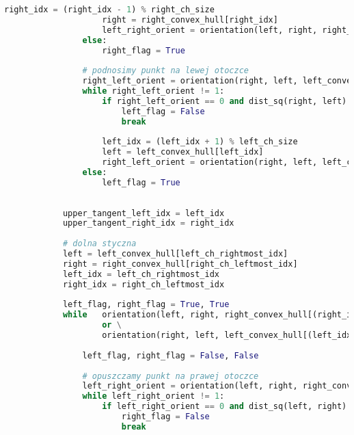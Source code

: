 \documentclass[11pt]{article}
\theoremstyle{remark} \newtheorem{definition}{def.}
\theoremstyle{definition} \newtheorem{twierdzenie}{tw.}
\begin{document}
\begin{lstlisting}[language=Python]
                    right_idx = (right_idx - 1) % right_ch_size
                    right = right_convex_hull[right_idx]
                    left_right_orient = orientation(left, right, right_convex_hull[(right_idx - 1) % right_ch_size])
                else:
                    right_flag = True
        
                # podnosimy punkt na lewej otoczce
                right_left_orient = orientation(right, left, left_convex_hull[(left_idx + 1) % left_ch_size])
                while right_left_orient != 1:
                    if right_left_orient == 0 and dist_sq(right, left) >= dist_sq(right, left_convex_hull[(left_idx + 1) % left_ch_size]):
                        left_flag = False
                        break
                    
                    left_idx = (left_idx + 1) % left_ch_size
                    left = left_convex_hull[left_idx]
                    right_left_orient = orientation(right, left, left_convex_hull[(left_idx + 1) % left_ch_size])
                else:
                    left_flag = True
                    
                    
            upper_tangent_left_idx = left_idx
            upper_tangent_right_idx = right_idx
            
            # dolna styczna
            left = left_convex_hull[left_ch_rightmost_idx]
            right = right_convex_hull[right_ch_leftmost_idx]
            left_idx = left_ch_rightmost_idx
            right_idx = right_ch_leftmost_idx
                    
            left_flag, right_flag = True, True
            while   orientation(left, right, right_convex_hull[(right_idx + 1) % right_ch_size]) != 1 and right_flag \
                    or \
                    orientation(right, left, left_convex_hull[(left_idx - 1) % left_ch_size]) != -1 and left_flag:
                        
                left_flag, right_flag = False, False
                
                # opuszczamy punkt na prawej otoczce
                left_right_orient = orientation(left, right, right_convex_hull[(right_idx + 1) % right_ch_size])
                while left_right_orient != 1:
                    if left_right_orient == 0 and dist_sq(left, right) >= dist_sq(left, right_convex_hull[(right_idx + 1) % right_ch_size]):
                        right_flag = False
                        break
                    

\end{lstlisting}
\end{document}
